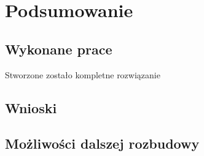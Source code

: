 \chapter{Podsumowanie}
	\section{Wykonane prace}
		Stworzone zostało kompletne rozwiązanie 
	\section{Wnioski}

	\section{Możliwości dalszej rozbudowy}